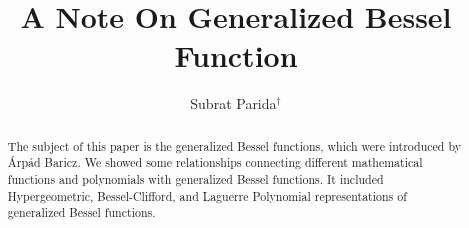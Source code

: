 \documentclass{amsart}
\theoremstyle{definition}
\theoremstyle{remark}
\numberwithin{equation}{section}
\begin{document}
\title[A Note On Generalized Bessel Function]{A Note On Generalized Bessel Function}%
\author{%
Subrat Parida$^\dag$}
\address{$^\dag$Department of Mathematics \\ Ramanujan School of Mathematical Sciences \\ Pondicherry University-A Central University \\ Pondicherry 605014, India.}

\begin{abstract}
The subject of this paper is the generalized Bessel functions, which were introduced by \'{A}rp\'{a}d Baricz.  We showed some relationships connecting different mathematical functions and polynomials with generalized Bessel functions. It included Hypergeometric, Bessel-Clifford, and Laguerre Polynomial representations of generalized Bessel functions.
\end{abstract}
\maketitle
\end{document}
